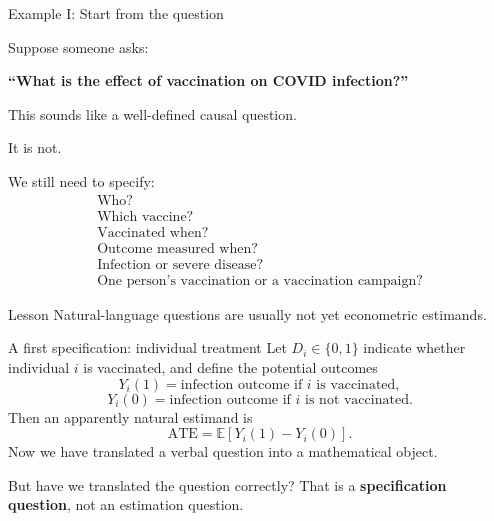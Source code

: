 \documentclass[aspectratio=169,11pt]{beamer}
\newcommand{\E}{\mathbb{E}}
\newcommand{\ATE}{\mathrm{ATE}}
\begin{document}
\begin{frame}{Example I: Start from the question}

Suppose someone asks:

\begin{center}
\Large
\textbf{``What is the effect of vaccination on COVID infection?''}
\end{center}

\vspace{0.5em}

This sounds like a well-defined causal question.

\pause

It is not.

\vspace{0.35em}

We still need to specify:
\[
\boxed{
\begin{array}{c}
\text{Who?}\\
\text{Which vaccine?}\\
\text{Vaccinated when?}\\
\text{Outcome measured when?}\\
\text{Infection or severe disease?}\\
\text{One person's vaccination or a vaccination campaign?}
\end{array}}
\]

\vspace{0.25em}

\begin{alertblock}{Lesson}
Natural-language questions are usually not yet econometric estimands.
\end{alertblock}

\end{frame}

\begin{frame}{A first specification: individual treatment}
Let $D_i\in\{0,1\}$ indicate whether individual $i$ is vaccinated, and define
the potential outcomes
\[
Y_i(1) = \text{infection outcome if }i\text{ is vaccinated},
\]
\[
Y_i(0) = \text{infection outcome if }i\text{ is not vaccinated}.
\]
Then an apparently natural estimand is
\[
\boxed{\ATE = \E[Y_i(1)-Y_i(0)].}
\]
Now we have translated a verbal question into a mathematical object.
\pause

\begin{alertblock}{But have we translated the question correctly?}
That is a \textbf{specification question}, not an estimation question.
\end{alertblock}
\end{frame}
\end{document}
